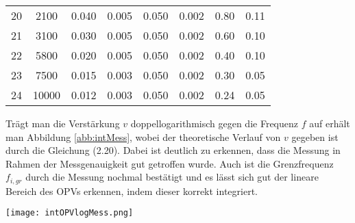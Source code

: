 \begin{center}
\begin{tabular}{l | c c c c c | c c}
        20 &   2100 &  0.040 &      0.005 &   0.050 &      0.002 &   0.80 &  0.11 \\
        21 &   3100 &  0.030 &      0.005 &   0.050 &      0.002 &   0.60 &  0.10 \\
        22 &   5800 &  0.020 &      0.005 &   0.050 &      0.002 &   0.40 &  0.10 \\
        23 &   7500 &  0.015 &      0.003 &   0.050 &      0.002 &   0.30 &  0.05 \\
        24 &  10000 &  0.012 &      0.003 &   0.050 &      0.002 &   0.24 &  0.05 \\
    \end{tabular}
    \label{tab:int}
\end{center}
Trägt man die Verstärkung $v$ doppellogarithmisch gegen die Frequenz $f$ auf erhält man Abbildung \ref{abb:intMess}, wobei der theoretische Verlauf von $v$ gegeben ist durch die Gleichung (2.20). Dabei ist deutlich zu erkennen, dass die Messung in Rahmen der Messgenauigkeit gut getroffen wurde. Auch ist die Grenzfrequenz $f_{i,gr}$ durch die Messung nochmal bestätigt und es lässt sich gut der lineare Bereich des OPVs erkennen, indem dieser korrekt integriert.
\newpage
\begin{center}
    \texttt{[image: intOPVlogMess.png]}
    \label{abb:intMess}
\end{center}